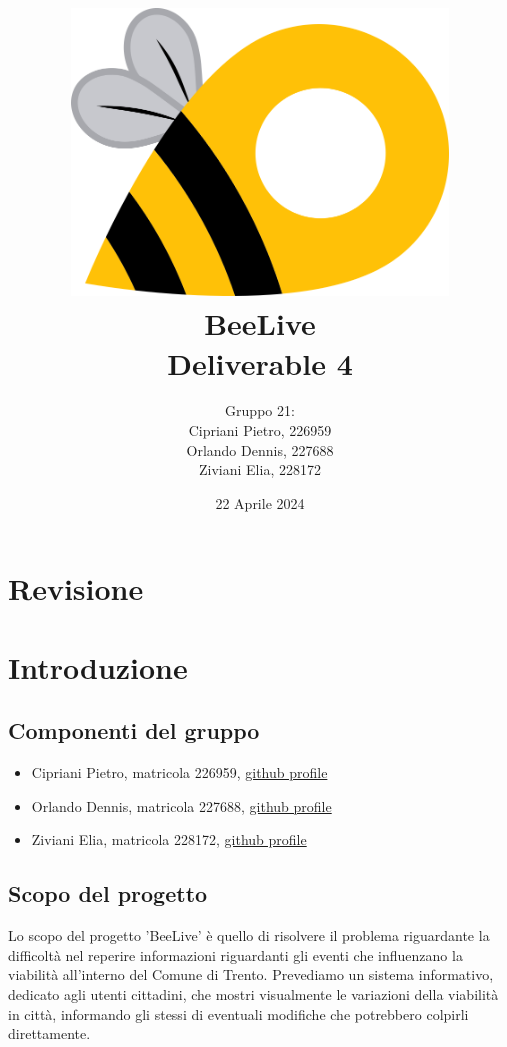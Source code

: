 \documentclass{article}
\title{\includegraphics[width=0.75\textwidth]{Images/BeeLive-Logo.png}\\\vspace{100pt}
\LARGE{\textbf{BeeLive\\Deliverable 4}}}
\author{Gruppo 21:\\
Cipriani Pietro, 226959\\
Orlando Dennis, 227688\\
Ziviani Elia, 228172}
\date{22 Aprile 2024}
\begin{document}
\maketitle
\thispagestyle{firstpage} %
\clearpage

\pagestyle{nonplain} %

\renewcommand{\contentsname}{Indice}
\tableofcontents

\clearpage

\section{Revisione}



\section{Introduzione}

\subsection{Componenti del gruppo}
\begin{itemize}
    \item Cipriani Pietro, matricola 226959, \lbrack\href{https://github.com/pietrocipriani}{github profile}\rbrack
    \item Orlando Dennis, matricola 227688, \lbrack\href{https://github.com/dennisorlando}{github profile}\rbrack
    \item Ziviani Elia, matricola 228172, \lbrack\href{https://github.com/ELI20ZIVI}{github profile}\rbrack
\end{itemize}

\subsection{Scopo del progetto}

Lo scopo del progetto 'BeeLive' è quello di risolvere il problema riguardante la difficoltà nel reperire informazioni riguardanti gli eventi che influenzano la viabilità all'interno del Comune di Trento. Prevediamo un sistema informativo, dedicato agli utenti cittadini, che mostri visualmente le variazioni della viabilità in città, informando gli stessi di eventuali modifiche che potrebbero colpirli direttamente.
\end{document}
